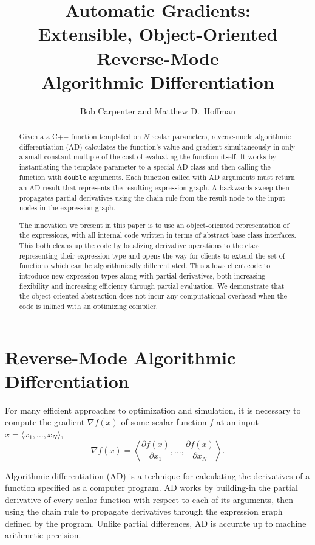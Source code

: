 \documentclass[12pt]{article}
\title{Automatic Gradients:
\\
Extensible, Object-Oriented Reverse-Mode 
\\
Algorithmic Differentiation}
\author{Bob Carpenter and Matthew D.\ Hoffman}
\begin{document}
\maketitle
\begin{abstract}
  Given a a C++ function templated on $N$ scalar parameters,
  reverse-mode algorithmic differentiation (AD) calculates the
  function's value and gradient simultaneously in only a small
  constant multiple of the cost of evaluating the function itself.  It
  works by instantiating the template parameter to a special AD class
  and then calling the function with {\tt double} arguments.  Each
  function called with AD arguments must return an AD result that
  represents the resulting expression graph.  A backwards sweep then
  propagates partial derivatives using the chain rule from the result
  node to the input nodes in the expression graph.

  The innovation we present in this paper is to use an object-oriented
  representation of the expressions, with all internal code written in
  terms of abstract base class interfaces.  This both cleans up the
  code by localizing derivative operations to the class representing
  their expression type and opens the way for clients to extend the
  set of functions which can be algorithmically differentiated.  This
  allows client code to introduce new expression types along with
  partial derivatives, both increasing flexibility and increasing
  efficiency through partial evaluation.  We demonstrate that the
  object-oriented abstraction does not incur any computational
  overhead when the code is inlined with an optimizing compiler.
\end{abstract}

\section{Reverse-Mode Algorithmic Differentiation}

For many efficient approaches to optimization and simulation, it is
necessary to compute the gradient $\nabla f(x)$ of some scalar
function $f$ at an input $x = \langle x_1,\ldots,x_N \rangle$,
%
\[
\nabla f(x) 
= \left\langle 
\frac{\partial f(x)}{\partial x_1},
\ldots,
\frac{\partial f(x)}{\partial x_N}
\right\rangle.
\]

Algorithmic differentiation (AD) is a technique for calculating the
derivatives of a function specified as a computer program.  AD works
by building-in the partial derivative of every scalar function with
respect to each of its arguments, then using the chain rule to
propagate derivatives through the expression graph defined by the
program.  Unlike partial differences, AD is accurate up to machine
arithmetic precision.
\end{document}
